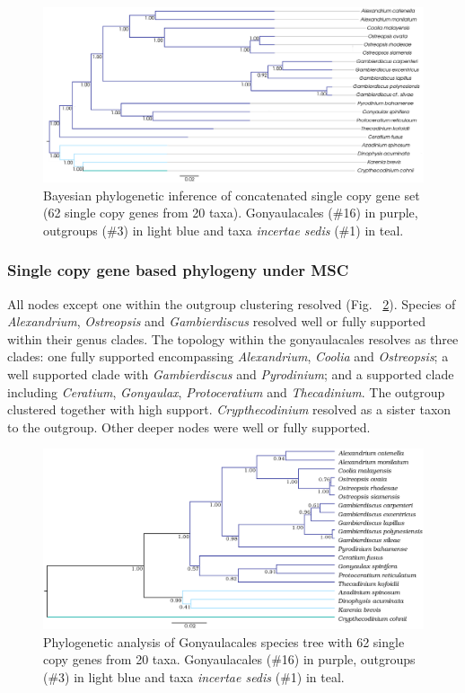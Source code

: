 \documentclass[12pt]{article}
\begin{document}
\begin{figure} 
\includegraphics[scale=.3]{figures/SC-concat-BI.png} 
\caption{Bayesian phylogenetic inference of concatenated single copy gene set (62 single copy genes from 20 taxa). Gonyaulacales (\#16) in purple, outgroups (\#3) in light blue and taxa \textit{incertae sedis} (\#1) in teal.} 
\label{fig:SCconcatBI}
\end{figure} 
\FloatBarrier

\subsubsection*{Single copy gene based phylogeny under MSC}
\FloatBarrier 
All nodes except one within the outgroup clustering resolved (Fig. ~\ref{fig:SCmscBI}). 
Species of \emph{Alexandrium}, \emph{Ostreopsis} and \emph{Gambierdiscus} resolved well or fully supported within their genus clades. 
The topology within the gonyaulacales resolves as three clades: 
one fully supported encompassing \emph{Alexandrium}, \emph{Coolia} and \emph{Ostreopsis}; 
a well supported clade with \emph{Gambierdiscus} and \emph{Pyrodinium}; 
and a supported clade including \emph{Ceratium}, \emph{Gonyaulax}, \emph{Protoceratium} and \emph{Thecadinium}. 
The outgroup clustered together with high support. 
\emph{Crypthecodinium} resolved as a sister taxon to the outgroup. 
Other deeper nodes were well or fully supported.

\begin{figure} 
\includegraphics[scale=.25]{figures/Aug2_20-taxa-combined-fig_MCC_trees.png} 
\caption{Phylogenetic analysis of Gonyaulacales species tree with 62 single copy genes from 20 taxa. Gonyaulacales (\#16) in purple, outgroups (\#3) in light blue and taxa \textit{incertae sedis} (\#1) in teal.} 
\label{fig:SCmscBI}
\end{figure} 
\FloatBarrier
\end{document}
